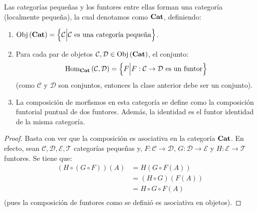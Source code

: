\documentclass[12pt]{report}
\newcounter{it}
\theoremstyle{largebreak}
\newcommand\cf[3]{\ensuremath{#1:#2\rightarrow#3}}
\newcommand{\Obj}[1]{\ensuremath{\textup{Obj}\left(#1\right)}}
\newcommand{\Hom}[3]{\ensuremath{\textup{Hom}_{#1}\left(#2,#3\right)}}
\newcommand{\Cat}[1]{\ensuremath{\textup{\textbf{#1}}}}
\begin{document}
    \begin{propo}
        Las categorías pequeñas y los funtores entre ellas forman una categoría (localmente pequeña), la cual denotamos como $\Cat{Cat}$, definiendo:
        \begin{enumerate}
            \item $\Obj{\Cat{Cat}}=\left\{\mathcal{C}\Big|\mathcal{C}\textup{ es una categoría pequeña} \right\}$.
            \item Para cada par de objetos $\mathcal{C},\mathcal{D}\in\Obj{\Cat{Cat}}$, el conjunto:
            \begin{equation*}
                \Hom{\Cat{Cat}}{\mathcal{C}}{\mathcal{D}}=\left\{F\Big|\cf{F}{\mathcal{C}}{\mathcal{D}}\textup{ es un funtor} \right\}
            \end{equation*}
            (como $\mathcal{C}$ y $\mathcal{D}$ son conjuntos, entonces la clase anterior debe ser un conjunto).
            \item La composición de morfismos en esta categoría se define como la composición funtorial puntual de dos funtores. Además, la identidad es el funtor identidad de la misma categoría.
        \end{enumerate}
    \end{propo}

    \begin{proof}
        Basta con ver que la composición es asociativa en la categoría $\Cat{Cat}$. En efecto, sean $\mathcal{C},\mathcal{D},\mathcal{E},\mathcal{T}$ categorías pequeñas y, $\cf{F}{\mathcal{C}}{\mathcal{D}}$, $\cf{G}{\mathcal{D}}{\mathcal{E}}$ y $\cf{H}{\mathcal{E}}{\mathcal{T}}$ funtores. Se tiene que:
        \begin{equation*}
            \begin{split}
                (H\circ (G\circ F))(A)&=H(G\circ F(A))\\
                &=(H\circ G) (F(A))\\
                &=H\circ G\circ F(A)\\
            \end{split}
        \end{equation*}
        (pues la composición de funtores como se definió es asociativa en objetos).
    \end{proof}
\end{document}
